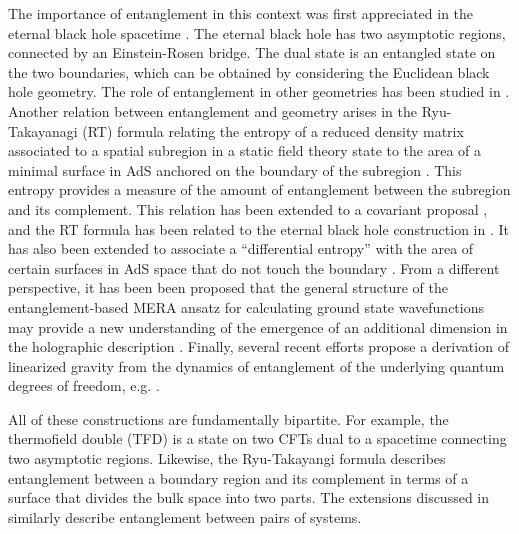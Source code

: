 \documentclass[12pt]{article}
\numberwithin{equation}{section}
\begin{document}
The importance of entanglement in this context was first appreciated in the eternal black hole spacetime \cite{Maldacena:2001kr}. The eternal black hole has two asymptotic regions, connected by an Einstein-Rosen bridge.  The dual state is an entangled state on the two boundaries, which can be obtained by considering the Euclidean black hole geometry. The role of entanglement in other geometries has been studied in \cite{VanRaamsdonk:2010pw,Czech:2012be,Maldacena:2013xja}. Another relation between entanglement and geometry arises in the Ryu-Takayanagi (RT) formula relating the entropy of a reduced density matrix associated to a spatial subregion in  a static field theory state to the area of a minimal surface in AdS anchored on the boundary of the subregion \cite{Ryu:2006bv}. This entropy provides a measure of the amount of entanglement between the subregion and its complement. This relation has been extended to a covariant proposal \cite{Hubeny:2007xt}, and the RT formula has been related to the eternal black hole construction in \cite{Lewkowycz:2013nqa}. It has also  been extended to associate a ``differential entropy'' with the area of certain surfaces in AdS space that do not touch the  boundary \cite{Bianchi:2012ev,Balasubramanian:2013rqa,Balasubramanian:2013lsa,Myers:2014jia}.  From a different perspective, it has been been proposed that the general structure of the entanglement-based MERA ansatz for calculating ground state wavefunctions may provide a new understanding of the emergence of an additional dimension in the holographic description \cite{Swingle:2009bg}.  Finally, several recent efforts propose a derivation of linearized gravity from the dynamics of entanglement of the underlying quantum degrees of freedom, e.g. \cite{Nozaki:2013vta,Lashkari:2013koa, Faulkner:2013ica, Swingle:2014uza}.


All of these constructions are fundamentally bipartite.  For example, the thermofield double (TFD) is a state on two CFTs dual to a spacetime connecting two asymptotic regions.  Likewise, the Ryu-Takayangi formula describes entanglement between a boundary region and its complement in terms of a surface that divides the bulk space into two parts.  The extensions discussed in \cite{VanRaamsdonk:2010pw,Czech:2012be,Maldacena:2013xja,Bianchi:2012ev,Balasubramanian:2013rqa,Balasubramanian:2013lsa,Myers:2014jia} similarly describe entanglement between pairs of systems.
\end{document}
